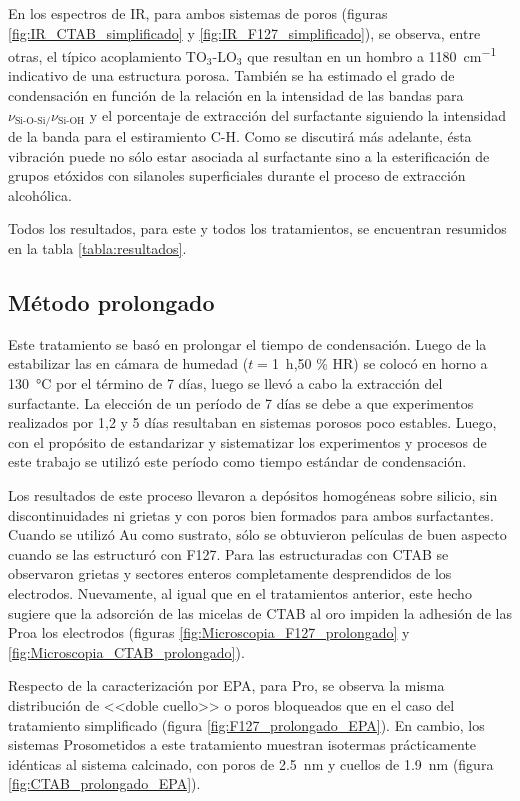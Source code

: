 {			 \pagebreak En los espectros de IR, para ambos sistemas de poros (figuras \ref{fig:IR_CTAB_simplificado} y \ref{fig:IR_F127_simplificado}), se observa, entre otras, el típico acoplamiento TO$_3$-LO$_3$ que resultan en un hombro a \SI{1180}{\cm^{-1}}} indicativo de una estructura porosa\cite{Innocenzi2003}. También se ha estimado el grado de condensación en función de la relación en la intensidad de las bandas para $\nu_{\text{Si-O-Si/}}\nu_{\text{Si-OH}}$ y el porcentaje de extracción del surfactante siguiendo la intensidad de la banda para el estiramiento C-H. Como se discutirá más adelante, ésta vibración puede no sólo estar asociada al surfactante sino a la esterificación de grupos etóxidos con silanoles superficiales durante el proceso de extracción alcohólica.

			 Todos los resultados, para este y todos los tratamientos, se encuentran resumidos en la tabla \ref{tabla:resultados}.

	 \subsection{Método prolongado}

	 	 Este tratamiento se basó en prolongar el tiempo de condensación. Luego de la estabilizar las \pdm\space en cámara de humedad ($t=$\SI{1}{\hour},50 \% HR) se colocó en horno a \SI{130}{\celsius} por el término de 7 días, luego se llevó a cabo la extracción del surfactante. La elección de un período de 7 días se debe a que experimentos realizados por 1,2 y 5 días resultaban en sistemas porosos poco estables. Luego, con el propósito de estandarizar y sistematizar los experimentos y procesos de este trabajo se utilizó este período como tiempo estándar de condensación.

	 	 Los resultados de este proceso llevaron a depósitos homogéneas sobre silicio, sin discontinuidades ni grietas y con poros bien formados para ambos surfactantes. Cuando se utilizó Au como sustrato, sólo se obtuvieron películas de buen aspecto cuando se las estructuró con F127. Para las estructuradas con CTAB se observaron grietas y sectores enteros completamente desprendidos de los electrodos. Nuevamente, al igual que en el tratamientos anterior, este hecho sugiere que la adsorción de las micelas de CTAB al oro impiden la adhesión de las Pro\pdmC\space a los electrodos (figuras \ref{fig:Microscopia_F127_prolongado} y \ref{fig:Microscopia_CTAB_prolongado}).

	 	 Respecto de la caracterización por EPA, para Pro\pdmF, se observa la misma distribución de <<doble cuello>> o poros bloqueados que en el caso del tratamiento simplificado (figura \ref{fig:F127_prolongado_EPA}). En cambio, los sistemas Pro\pdmC\space sometidos a este tratamiento muestran isotermas prácticamente idénticas al sistema calcinado, con poros de \SI{2,5}{\nm} y cuellos de \SI{1,9}{\nm} (figura \ref{fig:CTAB_prolongado_EPA}).

